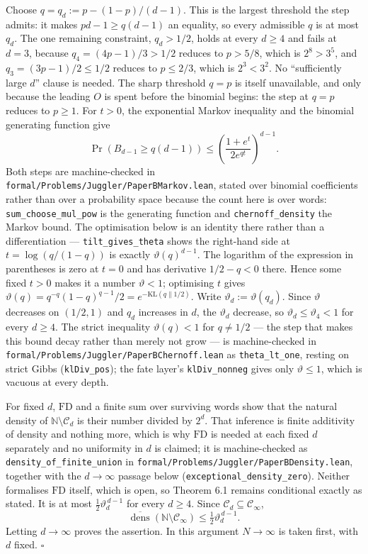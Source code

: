 \documentclass[11pt,a4paper]{article}
\begin{document}
Choose \(q=q_d:=p-(1-p)/(d-1)\). This is the largest threshold the step
admits: it makes \(pd-1\ge q(d-1)\) an equality, so every admissible
\(q\) is at most \(q_d\). The one remaining constraint, \(q_d>1/2\),
holds at every \(d\ge4\) and fails at \(d=3\), because
\(q_4=(4p-1)/3>1/2\) reduces to \(p>5/8\), which is \(2^8>3^5\), and
\(q_3=(3p-1)/2\le1/2\) reduces to \(p\le2/3\), which is \(2^3<3^2\). No
``sufficiently large \(d\)'' clause is needed. The sharp threshold
\(q=p\) is itself unavailable, and only because the leading \(O\) is
spent before the binomial begins: the step at \(q=p\) reduces to
\(p\ge1\). For \(t>0\), the exponential Markov inequality and the
binomial generating function give \[
\Pr(B_{d-1}\ge q(d-1))
\le\left(\frac{1+e^t}{2e^{qt}}\right)^{d-1}.
\] Both steps are machine-checked in
\texttt{formal/Problems/Juggler/PaperBMarkov.lean}, stated over binomial
coefficients rather than over a probability space because the count here
is over words: \texttt{sum\_choose\_mul\_pow} is the generating function
and \texttt{chernoff\_density} the Markov bound. The optimisation below
is an identity there rather than a differentiation ---
\texttt{tilt\_gives\_theta} shows the right-hand side at
\(t=\log(q/(1-q))\) is exactly \(\vartheta(q)^{d-1}\). The logarithm of
the expression in parentheses is zero at \(t=0\) and has derivative
\(1/2-q<0\) there. Hence some fixed \(t>0\) makes it a number
\(\vartheta<1\); optimising \(t\) gives
\(\vartheta(q)=q^{-q}(1-q)^{q-1}/2=e^{-\mathrm{KL}(q\|1/2)}\). Write
\(\vartheta_d:=\vartheta(q_d)\). Since \(\vartheta\) decreases on
\((1/2,1)\) and \(q_d\) increases in \(d\), the \(\vartheta_d\)
decrease, so \(\vartheta_d\le\vartheta_4<1\) for every \(d\ge4\). The
strict inequality \(\vartheta(q)<1\) for \(q\ne1/2\) --- the step that
makes this bound decay rather than merely not grow --- is
machine-checked in \texttt{formal/Problems/Juggler/PaperBChernoff.lean}
as \texttt{theta\_lt\_one}, resting on strict Gibbs
(\texttt{klDiv\_pos}); the fate layer's \texttt{klDiv\_nonneg} gives
only \(\vartheta\le1\), which is vacuous at every depth.

For fixed \(d\), \(\mathrm{FD}\) and a finite sum over surviving words
show that the natural density of \(\mathbb N\setminus\mathcal C_d\) is
their number divided by \(2^d\). That inference is finite additivity of
density and nothing more, which is why \(\mathrm{FD}\) is needed at each
fixed \(d\) separately and no uniformity in \(d\) is claimed; it is
machine-checked as \texttt{density\_of\_finite\_union} in
\texttt{formal/Problems/Juggler/PaperBDensity.lean}, together with the
\(d\to\infty\) passage below (\texttt{exceptional\_density\_zero}).
Neither formalises \(\mathrm{FD}\) itself, which is open, so Theorem 6.1
remains conditional exactly as stated. It is at most
\(\tfrac12\vartheta_d^{\,d-1}\) for every \(d\ge4\). Since
\(\mathcal C_d\subseteq\mathcal C_\infty\), \[
\overline{\operatorname{dens}}(\mathbb N\setminus\mathcal C_\infty)
\le\tfrac12\vartheta_d^{\,d-1}.
\] Letting \(d\to\infty\) proves the assertion. In this argument
\(N\to\infty\) is taken first, with \(d\) fixed. \(\square\)
\end{document}
